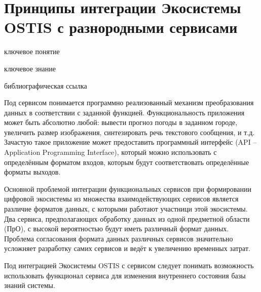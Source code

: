 \section{Принципы интеграции Экосистемы OSTIS с разнородными сервисами}
{\label{sec_integration_services}} 

\begin{SCn}

    \bigskip
    
    \begin{scnrelfromlist}{ключевое понятие}
    \end{scnrelfromlist}
    
    \bigskip
    
    \begin{scnrelfromlist}{ключевое знание}
    \end{scnrelfromlist}
    
    \bigskip
    
    \begin{scnrelfromlist}{библиографическая ссылка}
    \end{scnrelfromlist}
    
\end{SCn}

Под сервисом понимается программно реализованный механизм преобразования данных в соответствии с заданной функцией. Функциональность приложения может быть абсолютно любой: вывести прогноз погоды в заданном городе, увеличить размер изображения, синтезировать речь текстового сообщения, и т.д. Зачастую такое приложение может предоставить программный интерфейс (API -- Application Programming Interface), который можно использовать с определённым форматом входов, которым будут соответствовать определённые форматы выходов.

Основной проблемой интеграции функциональных сервисов при формировании цифровой экосистемы из множества взаимодействующих сервисов является различие форматов данных, с которыми работают участници этой экосистемы. Два сервиса, предполагающих обработку данных из одной предметной области (ПрО), с высокой вероятностью будут иметь различный формат данных. Проблема согласования формата данных различных сервисов значительно усложняет разработку самих сервисов и ведёт к увеличению временных затрат.

Под интеграцией Экосистемы OSTIS с сервисом следует понимать возможность использовать функционал сервиса для изменения внутреннего состояния базы знаний системы. 

